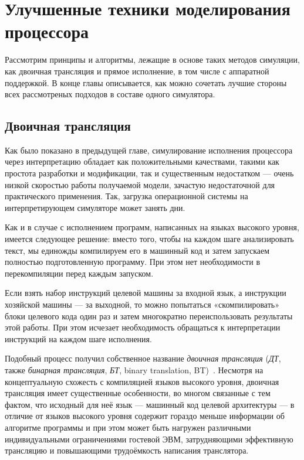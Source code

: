 \chapter{Улучшенные техники моделирования процессора}\label{chapter04}



Рассмотрим принципы и алгоритмы, лежащие в основе таких методов симуляции, как двоичная трансляция и прямое исполнение, в том числе с аппаратной поддержкой. В конце главы описывается, как можно сочетать лучшие стороны всех рассмотреных подходов в составе одного симулятора.

\section{Двоичная трансляция}

Как было показано в предыдущей главе, симулирование исполнения процессора через интерпретацию обладает как положительными качествами, такими как простота разработки и модификации, так и существенным недостатком --- очень низкой скоростью работы получаемой модели, зачастую недостаточной для практического применения. Так, загрузка операционной системы на интерпретирующем симуляторе может занять дни.

Как и в случае с исполнением программ, написанных на языках высокого уровня, имеется следующее решение: вместо того, чтобы на каждом шаге анализировать текст, мы единожды компилируем его в машинный код и затем запускаем полностью подготовленную программу. При этом нет необходимости в перекомпиляции перед каждым запуском.

Если взять набор инструкций целевой машины за входной язык, а инструкции хозяйской машины --- за выходной, то можно попытаться «скомпилировать» блоки целевого кода один раз и затем многократно переиспользовать результаты этой работы. При этом исчезает необходимость обращаться к интерпретации инструкций на каждом шаге исполнения.

Подобный процесс получил собственное название \textit{двоичная трансляция} (\textit{ДТ}, также \textit{бинарная трансляция}, \textit{БТ}, \abbr binary translation, BT)~\cite{bt1993}. Несмотря на концептуальную схожесть с компиляцией языков высокого уровня, двоичная трансляция имеет существенные особенности, во многом связанные с тем фактом, что исходный для неё язык --- машинный код целевой архитектуры --- в отличие от языков высокого уровня содержит гораздо меньше информации об алгоритме программы и при этом может быть нагружен различными индивидуальными ограничениями гостевой ЭВМ, затрудняющими эффективную трансляцию и повышающими трудоёмкость написания транслятора.

